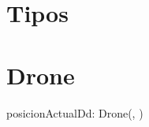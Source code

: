 \documentclass[a4paper]{article}
\begin{document}

\section{Tipos}



\section{Drone}



\begin{problema}{posicionActualD}{d: Drone}{(\ent, \ent)}
\end{problema}


%
\end{document}
